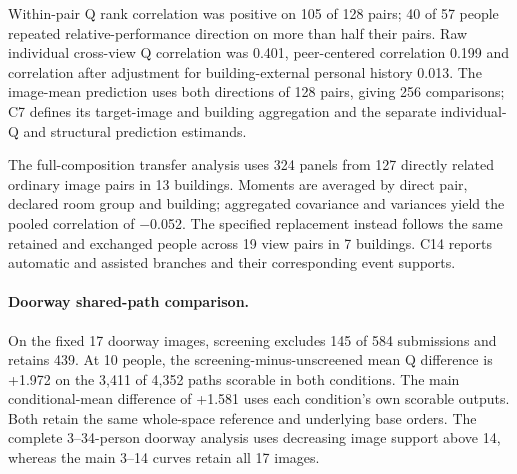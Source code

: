 Within-pair Q rank correlation was positive on 105 of 128 pairs; 40 of 57 people repeated relative-performance direction on more than half their pairs. Raw individual cross-view Q correlation was 0.401, peer-centered correlation 0.199 and correlation after adjustment for building-external personal history 0.013. The image-mean prediction uses both directions of 128 pairs, giving 256 comparisons; C7 defines its target-image and building aggregation and the separate individual-Q and structural prediction estimands.

The full-composition transfer analysis uses 324 panels from 127 directly related ordinary image pairs in 13 buildings. Moments are averaged by direct pair, declared room group and building; aggregated covariance and variances yield the pooled correlation of $-$0.052. The specified replacement instead follows the same retained and exchanged people across 19 view pairs in 7 buildings. C14 reports automatic and assisted branches and their corresponding event supports.

\paragraph{Doorway shared-path comparison.}
On the fixed 17 doorway images, screening excludes 145 of 584 submissions and retains 439. At 10 people, the screening-minus-unscreened mean Q difference is +1.972 on the 3,411 of 4,352 paths scorable in both conditions. The main conditional-mean difference of +1.581 uses each condition's own scorable outputs. Both retain the same whole-space reference and underlying base orders. The complete 3--34-person doorway analysis uses decreasing image support above 14, whereas the main 3--14 curves retain all 17 images.
